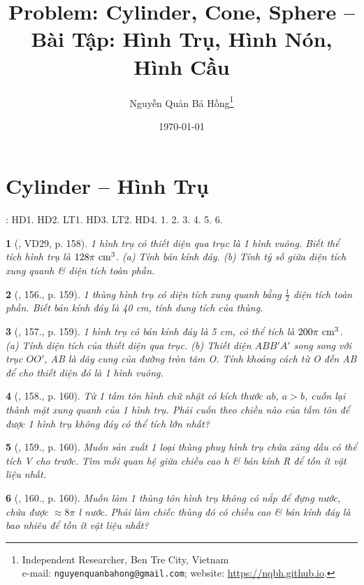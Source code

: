 \documentclass{article}
\title{Problem: Cylinder, Cone, Sphere -- Bài Tập: Hình Trụ, Hình Nón, Hình Cầu}
\author{Nguyễn Quản Bá Hồng\footnote{Independent Researcher, Ben Tre City, Vietnam\\e-mail: \texttt{nguyenquanbahong@gmail.com}; website: \url{https://nqbh.github.io}.}}
\date{\today}
\newtheorem{baitoan}{}
\begin{document}
\maketitle
\tableofcontents


\section{Cylinder -- Hình Trụ}
\cite[Chap. X, \S1, pp. 92--97]{SGK_Toan_9_Canh_Dieu_tap_1}: HD1. HD2. LT1. HD3. LT2. HD4. 1. 2. 3. 4. 5. 6.

\begin{baitoan}[\cite{Tuyen_Toan_9_old}, VD29, p. 158]
	1 hình trụ có thiết diện qua trục là 1 hình vuông. Biết thể tích hình trụ là $128\pi\ {\rm cm}^3$. (a) Tính bán kính đáy. (b) Tính tỷ số giữa diện tích xung quanh \& diện tích toàn phần.
\end{baitoan}

\begin{baitoan}[\cite{Tuyen_Toan_9_old}, 156., p. 159]
	1 thùng hình trụ có diện tích xung quanh bằng $\frac{1}{2}$ diện tích toàn phần. Biết bán kính đáy là {\rm40 cm}, tính dung tích của thùng.
\end{baitoan}

\begin{baitoan}[\cite{Tuyen_Toan_9_old}, 157., p. 159]
	1 hình trụ có bán kính đáy là {\rm5 cm}, có thể tích là $200\pi\ {\rm cm}^3$. (a) Tính diện tích của thiết diện qua trục. (b) Thiết diện $ABB'A'$ song song với trục $OO'$, AB là dây cung của đường tròn tâm O. Tính khoảng cách từ O đến AB để cho thiết diện đó là 1 hình vuông.
\end{baitoan}

\begin{baitoan}[\cite{Tuyen_Toan_9_old}, 158., p. 160]
	Từ 1 tấm tôn hình chữ nhật có kích thước $ab$, $a > b$, cuốn lại thành mặt xung quanh của 1 hình trụ. Phải cuốn theo chiều nào của tấm tôn để được 1 hình trụ không đáy có thể tích lớn nhất?
\end{baitoan}

\begin{baitoan}[\cite{Tuyen_Toan_9_old}, 159., p. 160]
	Muốn sản xuất 1 loại thùng phuy hình trụ chứa xăng dầu có thể tích V cho trước. Tìm mối quan hệ giữa chiều cao h \& bán kính R để tốn ít vật liệu nhất.
\end{baitoan}

\begin{baitoan}[\cite{Tuyen_Toan_9_old}, 160., p. 160]
	Muốn làm 1 thùng tôn hình trụ không có nắp để đựng nước, chứa được $\approx8\pi$ {\rm l} nước. Phải làm chiếc thùng đó có chiều cao \& bán kính đáy là bao nhiêu để tồn ít vật liệu nhất?
\end{baitoan}
\end{document}
